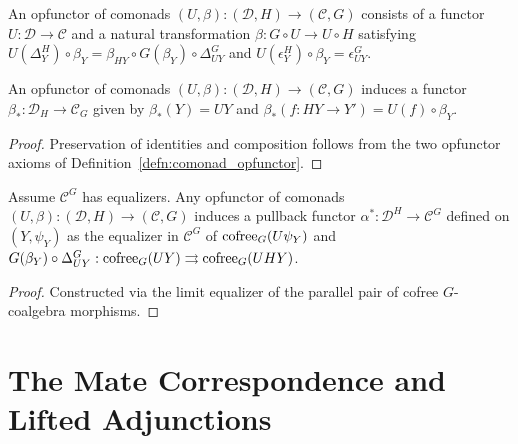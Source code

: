 \begin{definition}
  \label{defn:comonad_opfunctor}
  \leanok
  An opfunctor of comonads $(U, \beta) : (\mathcal{D}, H) \to (\mathcal{C}, G)$ consists of a functor $U : \mathcal{D} \to \mathcal{C}$ and a natural transformation $\beta : G \circ U \to U \circ H$ satisfying $U(\Delta^H_Y) \circ \beta_Y = \beta_{HY} \circ G(\beta_Y) \circ \Delta^G_{UY}$ and $U(\epsilon^H_Y) \circ \beta_Y = \epsilon^G_{UY}$.
\end{definition}

\begin{proposition}
  \label{prop:cokleisli_pushforward}
  \leanok
  An opfunctor of comonads $(U, \beta) : (\mathcal{D}, H) \to (\mathcal{C}, G)$ induces a functor $\beta_* : \mathcal{D}_H \to \mathcal{C}_G$ given by $\beta_*(Y) = UY$ and $\beta_*(f : HY \to Y') = U(f) \circ \beta_Y$.
\end{proposition}
\begin{proof}
  \leanok
  Preservation of identities and composition follows from the two opfunctor axioms of Definition~\ref{defn:comonad_opfunctor}.
\end{proof}

\begin{proposition}
  \label{prop:coalgebra_pullback}
  \leanok
  Assume $\mathcal{C}^G$ has equalizers. Any opfunctor of comonads $(U, \beta) : (\mathcal{D}, H) \to (\mathcal{C}, G)$ induces a pullback functor $\alpha^* : \mathcal{D}^H \to \mathcal{C}^G$ defined on $(Y, \psi_Y)$ as the equalizer in $\mathcal{C}^G$ of $\operatorname{cofree}_G(U\psi_Y)$ and $G(\beta_Y) \circ \Delta^G_{UY} : \operatorname{cofree}_G(UY) \rightrightarrows \operatorname{cofree}_G(UHY)$.
\end{proposition}
\begin{proof}
  \leanok
  Constructed via the limit equalizer of the parallel pair of cofree $G$-coalgebra morphisms.
\end{proof}

\section{The Mate Correspondence and Lifted Adjunctions}

